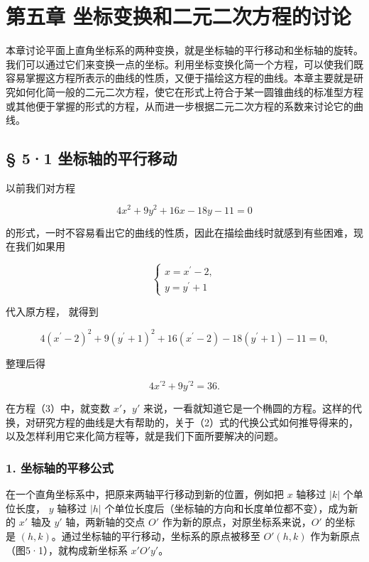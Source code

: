 \chapter{第五章
坐标变换和二元二次方程的讨论}\label{ux7b2cux4e94ux7ae0-ux5750ux6807ux53d8ux6362ux548cux4e8cux5143ux4e8cux6b21ux65b9ux7a0bux7684ux8ba8ux8bba}

本章讨论平面上直角坐标系的两种变换，就是坐标轴的平行移动和坐标轴的旋转。我们可以通过它们来变换一点的坐标。利用坐标变换化简一个方程，可以使我们既容易掌握这方程所表示的曲线的性质，又便于描绘这方程的曲线。本章主要就是研究如何化简一般的二元二次方程，使它在形式上符合于某一圆锥曲线的标准型方程或其他便于掌握的形式的方程，从而进一步根据二元二次方程的系数来讨论它的曲线。

\section{§ 5·1
坐标轴的平行移动}\label{ux5750ux6807ux8f74ux7684ux5e73ux884cux79fbux52a8}

以前我们对方程

\[
4 x^{2} + 9 y^{2} + 16 x - 18 y - 11 = 0 \tag {1}
\]

的形式，一时不容易看出它的曲线的性质，因此在描绘曲线时就感到有些困难，现在我们如果用

\[
\left\{ \begin{array}{l} x = x^{\prime} - 2, \\ y = y^{\prime} + 1 \end{array} \right. \tag {2}
\]

代入原方程， 就得到

\[
4 (x^{\prime} - 2) ^ {2} + 9 (y^{\prime} + 1) ^ {2} + 16 (x^{\prime} - 2) - 18 (y^{\prime} + 1) - 11 = 0,
\]

整理后得

\[
4 x^{\prime 2} + 9 y^{\prime 2} = 36. \tag {3}
\]

在方程（3）中，就变数 \(x'\)，\(y'\)
来说，一看就知道它是一个椭圆的方程。这样的代换，对研究方程的曲线是大有帮助的，关于（2）式的代换公式如何推导得来的，以及怎样利用它来化简方程等，就是我们下面所要解决的问题。

\subsection{1.
坐标轴的平移公式}\label{ux5750ux6807ux8f74ux7684ux5e73ux79fbux516cux5f0f}

在一个直角坐标系中，把原来两轴平行移动到新的位置，例如把 \(x\) 轴移过
\(|k|\) 个单位长度， \(y\) 轴移过 \(|h|\)
个单位长度后（坐标轴的方向和长度单位都不变），成为新的 \(x'\) 轴及
\(y'\) 轴，两新轴的交点 \(O'\) 作为新的原点，对原坐标系来说，\(O'\)
的坐标是 \((h, k)\)。通过坐标轴的平行移动，坐标系的原点被移至
\(O'(h, k)\) 作为新原点（图5·1），就构成新坐标系 \(x'O'y'\)。

